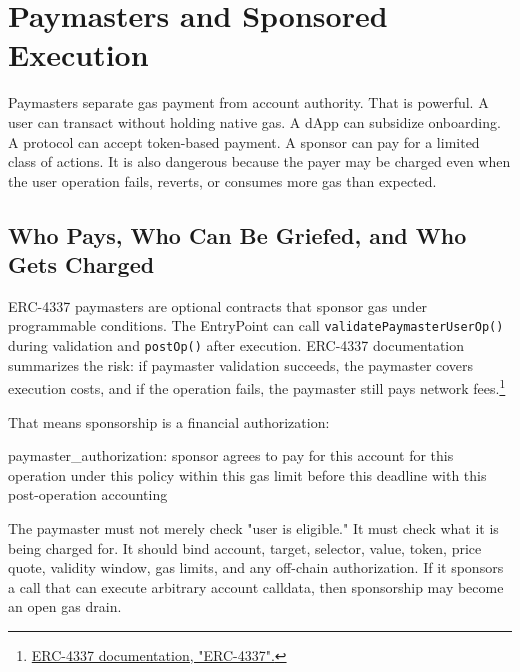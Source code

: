 \section{Paymasters and Sponsored Execution}

Paymasters separate gas payment from account authority. That is powerful. A user can transact without holding native gas. A dApp can subsidize onboarding. A protocol can accept token-based payment. A sponsor can pay for a limited class of actions. It is also dangerous because the payer may be charged even when the user operation fails, reverts, or consumes more gas than expected.

\subsection{Who Pays, Who Can Be Griefed, and Who Gets Charged}

ERC-4337 paymasters are optional contracts that sponsor gas under programmable conditions. The EntryPoint can call \texttt{validatePaymasterUserOp()} during validation and \texttt{postOp()} after execution. ERC-4337 documentation summarizes the risk: if paymaster validation succeeds, the paymaster covers execution costs, and if the operation fails, the paymaster still pays network fees.\footnote{\href{https://docs.erc4337.io/core-standards/erc-4337.html}{ERC-4337 documentation, "ERC-4337".}}

That means sponsorship is a financial authorization:

\begin{codeblock}
paymaster_authorization:
    sponsor agrees to pay for this account
    for this operation
    under this policy
    within this gas limit
    before this deadline
    with this post-operation accounting
\end{codeblock}

The paymaster must not merely check "user is eligible." It must check what it is being charged for. It should bind account, target, selector, value, token, price quote, validity window, gas limits, and any off-chain authorization. If it sponsors a call that can execute arbitrary account calldata, then sponsorship may become an open gas drain.

